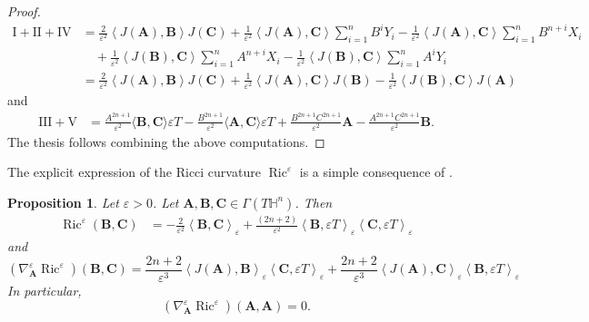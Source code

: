 \documentclass[11pt]{amsart}
\newcommand{\A}{\mathbf{A}}
\newcommand{\B}{\mathbf{B}}
\newcommand{\C}{\mathbf{C}}
\newcommand{\hh}{{\mathbb{H}}}
\newcommand{\eps}{\varepsilon}
\DeclareMathOperator{\ric}{Ric}
\newtheorem{proposition}[theorem]{Proposition}
\theoremstyle{definition}
\theoremstyle{remark}
\numberwithin{equation}{section}
\begin{document}
\begin{proof}
\begin{equation*}
\begin{split}
    \mathrm{I}+\mathrm{II}+\mathrm{IV}&=\frac{2}{\eps^2}\left\langle J(\A),\B\right\rangle J(\C)+\frac{1}{\eps^2}\left\langle J(\A),\C\right\rangle \sum_{i=1}^nB^i Y_i-\frac{1}{\eps^2}\left\langle J(\A),\C\right\rangle \sum_{i=1}^nB^{n+i} X_i\\
    &\quad+\frac{1}{\eps^2}\left\langle J(\B),\C\right\rangle \sum_{i=1}^nA^{n+i} X_i-\frac{1}{\eps^2}\left\langle J(\B),\C\right\rangle \sum_{i=1}^nA^{i} Y_i\\
    &=\frac{2}{\eps^2}\left\langle J(\A),\B\right\rangle J(\C)+\frac{1}{\eps^2}\left\langle J(\A),\C\right\rangle J(\B)-\frac{1}{\eps^2}\left\langle J(\B),\C\right\rangle J(\A)
\end{split}        
    \end{equation*}
    and 
    \begin{equation*}
        \begin{split}
            \mathrm{III}+\mathrm{V}&=\frac{A^{2n+1}}{\eps^2}\langle\B,\C\rangle \eps T-\frac{B^{2n+1}}{\eps^2}\langle\A,\C\rangle \eps T+\frac{B^{2n+1}C^{2n+1}}{\eps^2}\A-\frac{A^{2n+1}C^{2n+1}}{\eps^2}\B.
        \end{split}
    \end{equation*}
    The thesis follows combining the above computations.
\end{proof}
The explicit expression of the Ricci curvature $\ric^\eps$ is a simple consequence of .
\begin{proposition}
    Let $\eps>0$. Let $\A,\B,\C\in\Gamma(T\hh^n)$. Then
    \begin{equation}\label{ricciepsilon}
        \begin{split}
            \ric^\eps(\B,\C)&=-\frac{2}{\eps^2}\left\langle \B,\C\right\rangle_\eps +\frac{(2n+2)}{\eps^2}\left\langle \B,\eps T\right\rangle_\eps\left\langle \C,\eps T\right\rangle_\eps
        \end{split}
    \end{equation}
    and 
    \begin{equation*}
        \left(\nabla^\eps_\A\ric^\eps\right)(\B,\C)=\frac{2n+2}{\eps^3}\left\langle J(\A),\B\right\rangle_\eps\left\langle \C,\eps T\right\rangle_\eps+\frac{2n+2}{\eps^3}\left\langle J(\A),\C\right\rangle_\eps\left\langle \B,\eps T\right\rangle_\eps
    \end{equation*}
    In particular, 
    \begin{equation}\label{nabaepsriccizerosudiagonale}
        \left(\nabla^\eps_\A\ric^\eps\right)(\A,\A)=0.
    \end{equation}
\end{proposition}
\end{document}
